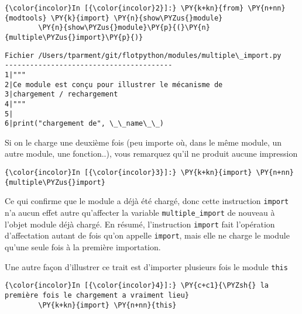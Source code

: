     \begin{Verbatim}[commandchars=\\\{\},frame=single,framerule=0.3mm,rulecolor=\color{cellframecolor}]
{\color{incolor}In [{\color{incolor}2}]:} \PY{k+kn}{from} \PY{n+nn}{modtools} \PY{k}{import} \PY{n}{show\PYZus{}module}
        \PY{n}{show\PYZus{}module}\PY{p}{(}\PY{n}{multiple\PYZus{}import}\PY{p}{)}
\end{Verbatim}


    \begin{Verbatim}[commandchars=\\\{\},frame=single,framerule=0.3mm,rulecolor=\color{cellframecolor}]
Fichier /Users/tparment/git/flotpython/modules/multiple\_import.py
----------------------------------------
1|"""
2|Ce module est conçu pour illustrer le mécanisme de
3|chargement / rechargement 
4|"""
5|
6|print("chargement de", \_\_name\_\_)
\end{Verbatim}

    Si on le charge une deuxième fois (peu importe où, dans le même module,
un autre module, une fonction..), vous remarquez qu'il ne produit aucune
impression

    \begin{Verbatim}[commandchars=\\\{\},frame=single,framerule=0.3mm,rulecolor=\color{cellframecolor}]
{\color{incolor}In [{\color{incolor}3}]:} \PY{k+kn}{import} \PY{n+nn}{multiple\PYZus{}import}
\end{Verbatim}


    Ce qui confirme que le module a déjà été chargé, donc cette instruction
\texttt{import} n'a aucun effet autre qu'affecter la variable
\texttt{multiple\_import} de nouveau à l'objet module déjà chargé. En
résumé, l'instruction \texttt{import} fait l'opération d'affectation
autant de fois qu'on appelle \texttt{import}, mais elle ne charge le
module qu'une seule fois à la première importation.

    Une autre façon d'illustrer ce trait est d'importer plusieurs fois le
module \texttt{this}

    \begin{Verbatim}[commandchars=\\\{\},frame=single,framerule=0.3mm,rulecolor=\color{cellframecolor}]
{\color{incolor}In [{\color{incolor}4}]:} \PY{c+c1}{\PYZsh{} la première fois le chargement a vraiment lieu}
        \PY{k+kn}{import} \PY{n+nn}{this}
\end{Verbatim}


